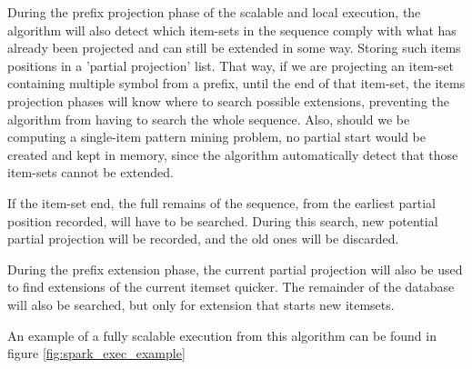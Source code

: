 \documentclass{eplmastersthesis}
\begin{document}
During the prefix projection phase of the scalable and local execution, the algorithm will also detect which item-sets in the sequence comply with what has already been projected and can still be extended in some way. Storing such items positions in a 'partial projection' list. \newline
That way, if we are projecting an item-set containing multiple symbol from a prefix, until the end of that item-set, the items projection phases will know where to search possible extensions, preventing the algorithm from having to search the whole sequence. \newline
Also, should we be computing a single-item pattern mining problem, no partial start would be created and kept in memory, since the algorithm automatically detect that those item-sets cannot be extended. \newline

If the item-set end, the full remains of the sequence, from the earliest partial position recorded, will have to be searched. During this search, new potential partial projection will be recorded, and the old ones will be discarded. \newline

During the prefix extension phase, the current partial projection will also be used to find extensions of the current itemset quicker. The remainder of the database will also be searched, but only for extension that starts new itemsets. \newline

An example of a fully scalable execution from this algorithm can be found in figure \ref{fig:spark_exec_example} \newline
\end{document}
